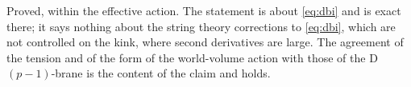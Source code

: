 \begin{verdict}[claim 21]
Proved, within the effective action. The statement is about \eqref{eq:dbi} and is exact there; it says nothing about the string theory corrections to \eqref{eq:dbi}, which are not controlled on the kink, where second derivatives are large. The agreement of the tension and of the form of the world-volume action with those of the D$(p-1)$-brane is the content of the claim and holds.
\end{verdict}
